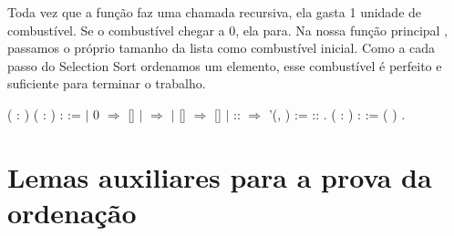     Toda vez que a função faz uma chamada recursiva, ela gasta 1 unidade de combustível. Se o combustível chegar a 0, ela para.
    Na nossa função principal , passamos o próprio tamanho da lista como combustível inicial. Como a cada passo do Selection Sort ordenamos um elemento, esse combustível é perfeito e suficiente para terminar o trabalho.
\begin{coqdoccode}
\coqdocemptyline
\coqdocnoindent
{}  ( : ) ( :  ) :   :=\coqdoceol
\coqdocindent{1.00em}
  \coqdoceol
\coqdocindent{1.00em}
\ensuremath{|} 0 \ensuremath{\Rightarrow} []\coqdoceol
\coqdocindent{1.00em}
\ensuremath{|}   \ensuremath{\Rightarrow}\coqdoceol
\coqdocindent{3.00em}
  \coqdoceol
\coqdocindent{3.00em}
\ensuremath{|} [] \ensuremath{\Rightarrow} []\coqdoceol
\coqdocindent{3.00em}
\ensuremath{|}  ::  \ensuremath{\Rightarrow}\coqdoceol
\coqdocindent{5.00em}
\coqdoceol
\coqdocindent{5.00em}
 '(, ) :=    \coqdoceol
\coqdocindent{5.00em}
\coqdoceol
\coqdocindent{5.00em}
 ::   \coqdoceol
\coqdocindent{3.00em}
\coqdoceol
\coqdocindent{1.00em}
.\coqdoceol
\coqdocemptyline
\coqdocnoindent
{}  ( :  ) :   :=\coqdoceol
\coqdocindent{1.00em}
 ( ) .\coqdoceol
\coqdocemptyline
\end{coqdoccode}
\section{Lemas auxiliares para a prova da ordenação}



